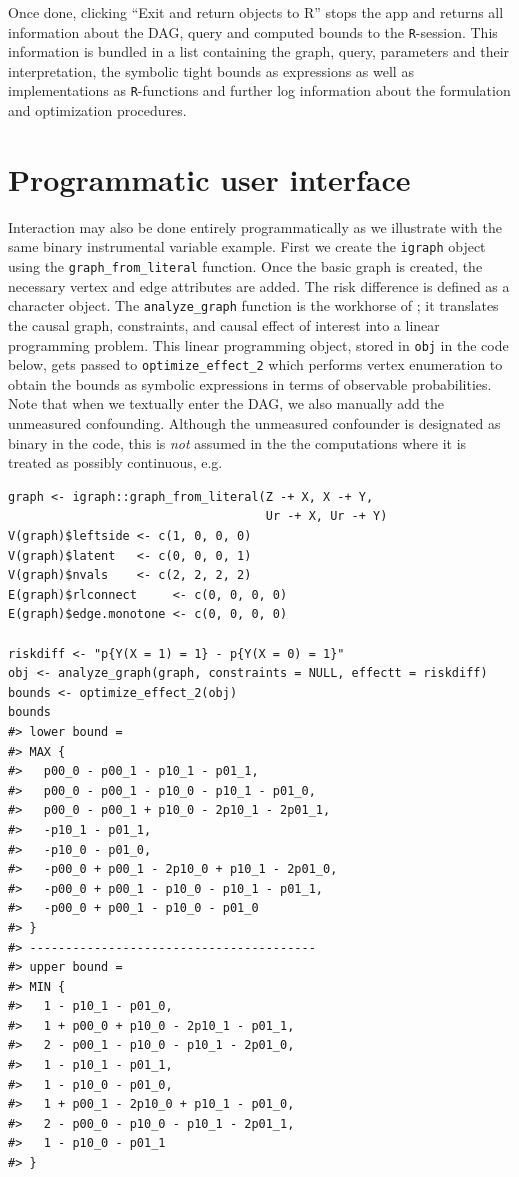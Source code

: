 Once done, clicking ``Exit and return objects to R'' stops the  app and returns all information about the DAG, query and computed bounds to the \texttt{R}-session.
This information is bundled in a list containing the graph, query, parameters and their interpretation, the symbolic tight bounds as expressions as well as implementations as \texttt{R}-functions and further log information about the formulation and optimization procedures.

\hypertarget{programmatic-user-interface}{%
\section{Programmatic user interface}\label{programmatic-user-interface}}

Interaction may also be done entirely programmatically as we illustrate with the same binary instrumental variable example. First we create the \texttt{igraph} object using the \texttt{graph\_from\_literal} function. Once the basic graph is created, the necessary vertex and edge attributes are added. The risk difference is defined as a character object. The \texttt{analyze\_graph} function is the workhorse of ; it translates the causal graph, constraints, and causal effect of interest into a linear programming problem. This linear programming object, stored in \texttt{obj} in the code below, gets passed to \texttt{optimize\_effect\_2} which performs vertex enumeration to obtain the bounds as symbolic expressions in terms of observable probabilities. Note that when we textually enter the DAG, we also manually add the unmeasured confounding. Although the unmeasured confounder is designated as binary in the code, this is \emph{not} assumed in the the computations where it is treated as possibly continuous, e.g.

\begin{verbatim}
graph <- igraph::graph_from_literal(Z -+ X, X -+ Y, 
                                    Ur -+ X, Ur -+ Y)
V(graph)$leftside <- c(1, 0, 0, 0)
V(graph)$latent   <- c(0, 0, 0, 1)
V(graph)$nvals    <- c(2, 2, 2, 2)
E(graph)$rlconnect     <- c(0, 0, 0, 0)
E(graph)$edge.monotone <- c(0, 0, 0, 0)

riskdiff <- "p{Y(X = 1) = 1} - p{Y(X = 0) = 1}"
obj <- analyze_graph(graph, constraints = NULL, effectt = riskdiff)
bounds <- optimize_effect_2(obj)
bounds
#> lower bound =  
#> MAX {
#>   p00_0 - p00_1 - p10_1 - p01_1,
#>   p00_0 - p00_1 - p10_0 - p10_1 - p01_0,
#>   p00_0 - p00_1 + p10_0 - 2p10_1 - 2p01_1,
#>   -p10_1 - p01_1,
#>   -p10_0 - p01_0,
#>   -p00_0 + p00_1 - 2p10_0 + p10_1 - 2p01_0,
#>   -p00_0 + p00_1 - p10_0 - p10_1 - p01_1,
#>   -p00_0 + p00_1 - p10_0 - p01_0
#> }
#> ----------------------------------------
#> upper bound =  
#> MIN {
#>   1 - p10_1 - p01_0,
#>   1 + p00_0 + p10_0 - 2p10_1 - p01_1,
#>   2 - p00_1 - p10_0 - p10_1 - 2p01_0,
#>   1 - p10_1 - p01_1,
#>   1 - p10_0 - p01_0,
#>   1 + p00_1 - 2p10_0 + p10_1 - p01_0,
#>   2 - p00_0 - p10_0 - p10_1 - 2p01_1,
#>   1 - p10_0 - p01_1
#> }
\end{verbatim}

